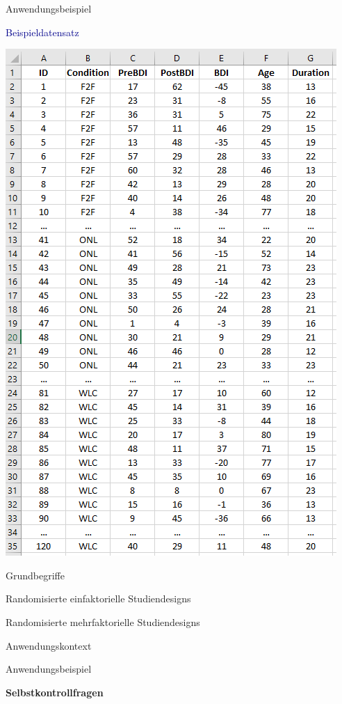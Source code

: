 \documentclass[
  8pt,
  ignorenonframetext,
]{beamer}
\begin{document}
\begin{frame}[t]{Anwendungsbeispiel}
\protect\hypertarget{anwendungsbeispiel-2}{}
\center

\textcolor{darkblue}{Beispieldatensatz}

\begin{center}\includegraphics[width=0.4\linewidth]{8_Abbildungen/alm_8_model_datensatz} \end{center}
\end{frame}

\begin{frame}[plain]{}
\protect\hypertarget{section-8}{}
\vfill
\large
{}

Grundbegriffe

Randomisierte einfaktorielle Studiendesigns

Randomisierte mehrfaktorielle Studiendesigns

Anwendungskontext

Anwendungsbeispiel

\textbf{Selbstkontrollfragen} \vfill
\end{frame}
\end{document}
